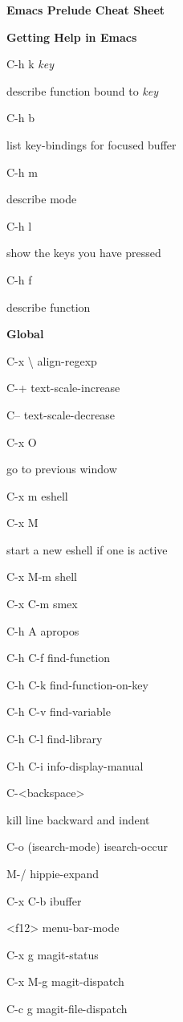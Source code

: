 \documentclass[10pt]{article}
\renewcommand\section[1]{\bigskip\par\textbf{\color{heading}\large#1}\smallskip}
\newcommand\humanreadable[1]{{\par\color{default}\small\sffamily#1}}
\newcommand\meta[1]{\textlangle\textit{#1}\textrangle}
\begin{document}
\begin{multicols}{4}

  \setlength{\columnsep}{1cm}
  \begin{center}
    \LARGE\color{heading}\textbf{Emacs Prelude Cheat Sheet}
  \end{center}

  \section{Getting Help in Emacs}
  \begin{keylist}
  \item[C-h k \meta{key}] \humanreadable{describe function bound to \meta{key}}
  \item[C-h b] \humanreadable{list key-bindings for focused buffer}
  \item[C-h m] \humanreadable{describe mode}
  \item[C-h l] \humanreadable{show the keys you have pressed}
  \item[C-h f] \humanreadable{describe function}
  \end{keylist}

  \section{Global}
  \begin{keylist}
  \item[C-x \textbackslash] align-regexp
  \item[C-+] text-scale-increase
  \item[C--] text-scale-decrease
  \item[C-x O] \humanreadable{go to previous window}
  \item[C-x m] eshell
  \item[C-x M] \humanreadable{start a new eshell if one is active}
  \item[C-x M-m] shell
  \item[C-x C-m] smex
  \item[C-h A] apropos
  \item[C-h C-f] find-function
  \item[C-h C-k] find-function-on-key
  \item[C-h C-v] find-variable
  \item[C-h C-l] find-library
  \item[C-h C-i] info-display-manual
  \item[C-<backspace>] \humanreadable{kill line backward and indent}
  \item[C-o] (isearch-mode) isearch-occur
  \item[M-/] hippie-expand
  \item[C-x C-b] ibuffer
  \item[<f12>] menu-bar-mode
  \item[C-x g] magit-status
  \item[C-x M-g] magit-dispatch
  \item[C-c g] magit-file-dispatch
  \end{keylist}


\end{multicols}
\end{document}
